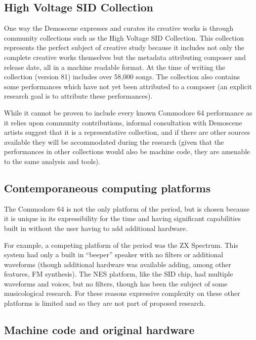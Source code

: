 \documentclass[10pt]{article}
\begin{document}
\begin{multicols*}{2}
\subsection{High Voltage SID Collection}

One way the Demoscene expresses and curates its creative works is through community collections such as the High Voltage SID Collection\cite{hvsc}. This collection represents the perfect subject of creative study because it includes not only the complete creative works themselves but the metadata attributing composer and release date, all in a machine readable format. At the time of writing the collection (version 81) includes over 58,000 songs. The collection also contains some performances which have not yet been attributed to a composer (an explicit research goal is to attribute these performances).

While it cannot be proven to include every known Commodore 64 performance as it relies upon community contributions, informal consultation with Demoscene artists suggest that it is a representative collection, and if there are other sources available they will be accommodated during the research (given that the performances in other collections would also be machine code, they are amenable to the same analysis and tools).

\subsection{Contemporaneous computing platforms}

The Commodore 64 is not the only platform of the period, but is chosen because it is unique in its expressibility for the time and having significant capabilities built in without the user having to add additional hardware.

For example, a competing platform of the period was the ZX Spectrum\cite{attrclash}. This system had only a built in “beeper” speaker with no filters or additional waveforms (though additional hardware was available adding, among other features, FM synthesis). The NES platform, like the SID chip, had multiple waveforms and voices, but no filters, though has been the subject of some musicological research\cite{nesmusic}. For these reasons expressive complexity on these other platforms is limited and so they are not part of proposed research.

\subsection{Machine code and original hardware}


\end{multicols*}
\end{document}
